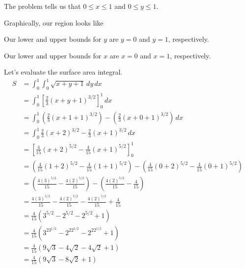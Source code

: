 \documentclass{article}
\newcommand{\lrp}[1]{\left( #1 \right)}
\newcommand{\lrb}[1]{\left[ #1 \right]}
\begin{document}
The problem tells us that $0\leq x\leq 1$ and $0\leq y\leq 1$.

Graphically, our region looks like \begin{center}
\end{center}
Our lower and upper bounds for $y$ are $y=0$ and $y=1$, respectively.

Our lower and upper bounds for $x$ are $x=0$ and $x=1$, respectively.

Let's evaluate the surface area integral.
\begin{align*}
    S&=\int_0^1\int_0^1 \sqrt{x+y+1}\,dy\,dx\\
    &=\int_0^1 \lrb{\frac{2}{3}(x+y+1)^{3/2}}_0^1\,dx\tag{or do $u$-sub, $u=x+y+1$}\\
    &=\int_0^1 \lrp{\frac{2}{3}(x+1+1)^{3/2}}-\lrp{\frac{2}{3}(x+0+1)^{3/2}}\,dx\\
    &=\int_0^1 \frac{2}{3}\lrp{x+2}^{3/2}-\frac{2}{3}(x+1)^{3/2}\,dx\\
    &=\lrb{\frac{4}{15}(x+2)^{5/2}-\frac{4}{15}(x+1)^{5/2}}_0^1\tag{or do $u$-sub(s), $u_1=x+2$, $u_2=x+1$}\\
    &=\lrp{\frac{4}{15}(1+2)^{5/2}-\frac{4}{15}(1+1)^{5/2}}-\lrp{\frac{4}{15}(0+2)^{5/2}-\frac{4}{15}(0+1)^{5/2}}\\
    &=\lrp{\frac{4\lrp{3}^{5/2}}{15}-\frac{4(2)^{5/2}}{15}}-\lrp{\frac{4(2)^{5/2}}{15}-\frac{4}{15}}\\
    &={\frac{4\lrp{3}^{5/2}}{15}-\frac{4(2)^{5/2}}{15}}-{\frac{4(2)^{5/2}}{15}}+{\frac{4}{15}}\\
    &=\frac{4}{15}\lrp{3^{5/2}-2^{5/2}-2^{5/2}+1}\\
    &=\frac{4}{15}\lrp{3^23^{1/2}-2^22^{1/2}-2^22^{1/2}+1}\\
    &=\frac{4}{15}\lrp{9\sqrt{3}-4\sqrt{2}-4\sqrt{2}+1}\\
    &=\boxed{\frac{4}{15}\lrp{9\sqrt{3}-8\sqrt{2}+1}}
\end{align*}
\end{document}
